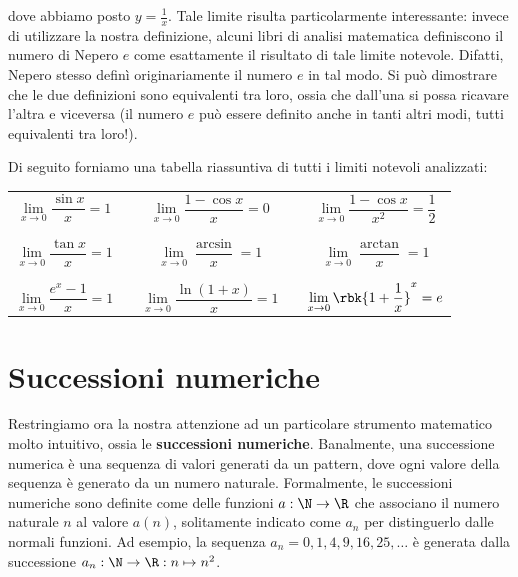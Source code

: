 \documentclass[a4paper, 12pt]{report}
\begin{document}
    dove abbiamo posto $y = \frac{1}{x}$. Tale limite risulta particolarmente interessante: invece di utilizzare la nostra definizione, alcuni libri di analisi matematica definiscono il numero di Nepero $e$ come esattamente il risultato di tale limite notevole. Difatti, Nepero stesso definì originariamente il numero $e$ in tal modo. Si può dimostrare che le due definizioni sono equivalenti tra loro, ossia che dall'una si possa ricavare l'altra e viceversa (il numero $e$ può essere definito anche in tanti altri modi, tutti equivalenti tra loro!). 

    Di seguito forniamo una tabella riassuntiva di tutti i limiti notevoli analizzati:
    \begin{center}
        \begin{tabular}{ccccc}
            \\
            $\lim\limits_{x \to 0} \dfrac{\sin x}{x} = 1$ & \qquad\qquad & $\lim\limits_{x \to 0} \dfrac{1-\cos x}{x} = 0$ & \qquad\qquad & $\lim\limits_{x \to 0} \dfrac{1-\cos x}{x^2} = \dfrac{1}{2}$ \\\\\\
            $\lim\limits_{x \to 0} \dfrac{\tan x}{x} = 1$ & \qquad\qquad & $\lim\limits_{x \to 0} \dfrac{\arcsin}{x} = 1$ & \qquad\qquad & $\lim\limits_{x \to 0} \dfrac{\arctan}{x} = 1$ \\\\\\
            $\lim\limits_{x \to 0} \dfrac{e^x-1}{x} = 1$ & \qquad\qquad & $\lim\limits_{x \to 0} \dfrac{\ln(1+x)}{x} = 1$ & \qquad\qquad & $\lim\limits_{x \to 0} \rbk{1+\dfrac{1}{x}}^x = e$ 
        \end{tabular}
    \end{center}

    \newpage

    \section{Successioni numeriche}

    Restringiamo ora la nostra attenzione ad un particolare strumento matematico molto intuitivo, ossia le \textbf{successioni numeriche}. Banalmente, una successione numerica è una sequenza di valori generati da un pattern, dove ogni valore della sequenza è generato da un numero naturale. Formalmente, le successioni numeriche sono definite come delle funzioni $a : \N \to \R$ che associano il numero naturale $n$ al valore $a(n)$, solitamente indicato come $a_n$ per distinguerlo dalle normali funzioni. Ad esempio, la sequenza $a_n = 0, 1, 4, 9, 16, 25, \ldots$ è generata dalla successione $a_n : \N \to \R : n \mapsto n^2$.
\end{document}
